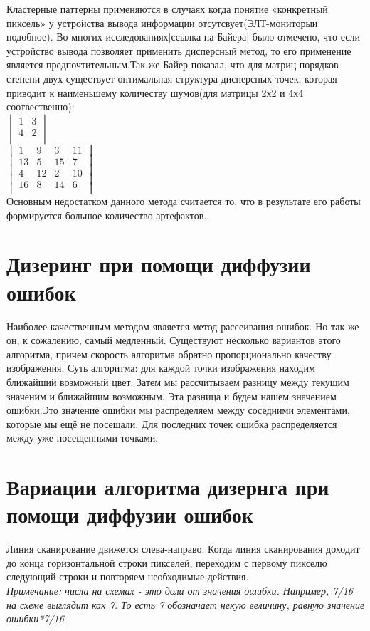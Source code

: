 Кластерные паттерны применяются в случаях когда понятие «конкретный пиксель» у устройства вывода информации отсутсвует(ЭЛТ-мониторыи подобное). Во многих исследованиях[ссылка на Байера] было отмечено, что если устройство вывода позволяет применить дисперсный метод, то его применение является предпочтительным.Так же Байер \cite{Bayer} показал, что для матриц порядков степени двух существует оптимальная структура дисперсных точек, которая приводит к наименьшему количеству шумов(для матрицы 2х2 и 4х4 соотвественно):\\
$\begin{vmatrix}
1 & 3 \\          
4 & 2   \\
\end{vmatrix}$
 \\
 $\begin{vmatrix}
1& 9& 3& 11\\
13& 5& 15& 7\\
4& 12& 2& 10\\
16& 8&14&6\\
\end{vmatrix}$\\
Основным недостатком данного метода считается то, что в результате его работы формируется большое количество артефактов\cite{Ulich}.
\section{Дизеринг при помощи диффузии ошибок}
Наиболее качественным методом является метод рассеивания ошибок. Но так же он, к сожалению, самый медленный. Существуют несколько вариантов этого алгоритма, причем скорость алгоритма обратно пропорционально качеству изображения.
Суть алгоритма: для каждой точки изображения находим ближайший возможный цвет. Затем мы рассчитываем разницу между текущим значеним и ближайшим возможным. Эта разница и будем нашем значением ошибки.Это значение ошибки мы распределяем между соседними элементами, которые мы ещё не посещали. Для последних точек ошибка распределяется между уже посещенными точками.
\section{Вариации алгоритма дизернга при помощи диффузии ошибок}
Линия сканирование движется слева-направо. Когда линия сканирования доходит до конца горизонтальной строки пикселей, переходим с первому пикселю следующий строки и повторяем необходимые действия.\\
 \textit{Примечание: числа на схемах - это доли от значения  ошибки. Например, 7/16 на схеме выглядит как 7. То есть 7 обозначает некую величину, равную значение ошибки*7/16 }

